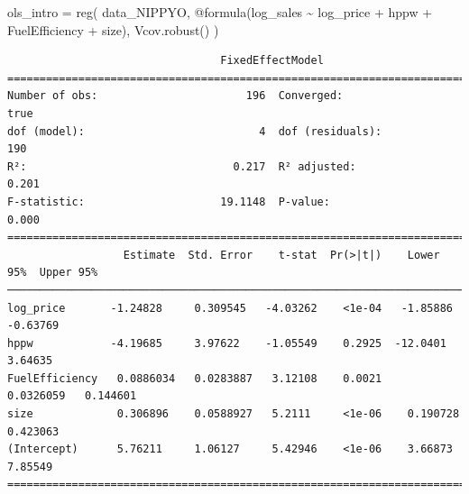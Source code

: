 \documentclass[
  letterpaper,
  DIV=11,
  numbers=noendperiod]{scrreprt}
\newenvironment{Shaded}{\begin{snugshade}}{\end{snugshade}}
\newcommand{\FunctionTok}[1]{\textcolor[rgb]{0.28,0.35,0.67}{#1}}
\newcommand{\NormalTok}[1]{\textcolor[rgb]{0.00,0.23,0.31}{#1}}
\newcommand{\OperatorTok}[1]{\textcolor[rgb]{0.37,0.37,0.37}{#1}}
\newcommand{\PreprocessorTok}[1]{\textcolor[rgb]{0.68,0.00,0.00}{#1}}
\begin{document}
\begin{Shaded}
\begin{Highlighting}[]
\NormalTok{ols\_intro }\OperatorTok{=} \FunctionTok{reg}\NormalTok{(}
\NormalTok{    data\_NIPPYO, }
    \PreprocessorTok{@formula}\NormalTok{(log\_sales }\OperatorTok{\textasciitilde{}}\NormalTok{ log\_price }\OperatorTok{+}\NormalTok{ hppw }\OperatorTok{+}\NormalTok{ FuelEfficiency }\OperatorTok{+}\NormalTok{ size),}
\NormalTok{    Vcov.}\FunctionTok{robust}\NormalTok{()}
\NormalTok{)}
\end{Highlighting}
\end{Shaded}

\begin{verbatim}
                                 FixedEffectModel                                 
==================================================================================
Number of obs:                       196  Converged:                          true
dof (model):                           4  dof (residuals):                     190
R²:                                0.217  R² adjusted:                       0.201
F-statistic:                     19.1148  P-value:                           0.000
==================================================================================
                  Estimate  Std. Error    t-stat  Pr(>|t|)    Lower 95%  Upper 95%
──────────────────────────────────────────────────────────────────────────────────
log_price       -1.24828     0.309545   -4.03262    <1e-04   -1.85886    -0.63769
hppw            -4.19685     3.97622    -1.05549    0.2925  -12.0401      3.64635
FuelEfficiency   0.0886034   0.0283887   3.12108    0.0021    0.0326059   0.144601
size             0.306896    0.0588927   5.2111     <1e-06    0.190728    0.423063
(Intercept)      5.76211     1.06127     5.42946    <1e-06    3.66873     7.85549
==================================================================================
\end{verbatim}
\end{document}
